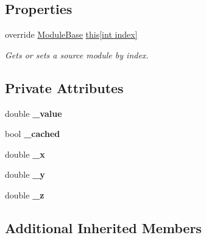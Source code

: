 \subsection*{Properties}
\begin{DoxyCompactItemize}
\item 
override \hyperlink{class_lib_noise_1_1_module_base}{Module\+Base} \hyperlink{class_lib_noise_1_1_operator_1_1_cache_abc7b67db7bbe4b93fcf733a2e9b4555a}{this\mbox{[}int index\mbox{]}}
\begin{DoxyCompactList}\small\item\em Gets or sets a source module by index. \end{DoxyCompactList}\end{DoxyCompactItemize}
\subsection*{Private Attributes}
\begin{DoxyCompactItemize}
\item 
\mbox{\label{class_lib_noise_1_1_operator_1_1_cache_a6d9f85b39fd1c5aa762104a1f4b760b9}} 
double {\bfseries \+\_\+value}
\item 
\mbox{\label{class_lib_noise_1_1_operator_1_1_cache_a2cafc5e5969d18e2ef9046dbd3501119}} 
bool {\bfseries \+\_\+cached}
\item 
\mbox{\label{class_lib_noise_1_1_operator_1_1_cache_a2bef7c4df9e7870d1960e70f41308bfc}} 
double {\bfseries \+\_\+x}
\item 
\mbox{\label{class_lib_noise_1_1_operator_1_1_cache_a009a0b1be48eb19f1582f946455ef468}} 
double {\bfseries \+\_\+y}
\item 
\mbox{\label{class_lib_noise_1_1_operator_1_1_cache_abb6ba1edcf22f777b294324e5a329c62}} 
double {\bfseries \+\_\+z}
\end{DoxyCompactItemize}
\subsection*{Additional Inherited Members}


